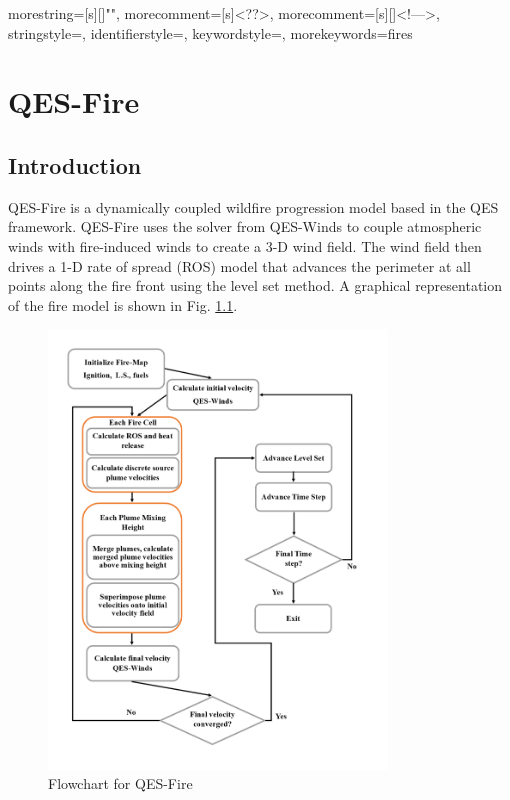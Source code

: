 {
  morestring=[s][\color{mauve}]{"}{"},
  morecomment=[s]{<?}{?>},
  morecomment=[s][\color{dkgreen}]{<!--}{-->},
  stringstyle=\color{black},
  identifierstyle=\color{lightblue},
  keywordstyle=\color{red},
  morekeywords={fires}%
}

\chapter{QES-Fire}

\section{Introduction}

QES-Fire \cite{Moody2022,Moody2023} is a dynamically coupled wildfire progression model based in the QES framework. QES-Fire uses the solver from QES-Winds to couple atmospheric winds with fire-induced winds to create a 3-D wind field. The wind field then drives a 1-D rate of spread (ROS) model that advances the perimeter at all points along the fire front using the level set method. A graphical representation of the fire model is shown in Fig. \ref{fig:fire_flow}.   

\begin{figure}[H]
\includegraphics[width=9cm]{Images/Fire-Flowchart.png}
\caption{Flowchart for QES-Fire}
\label{fig:fire_flow}
\end{figure}

